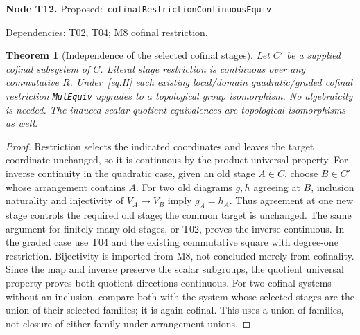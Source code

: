 \documentclass[11pt]{article}
\newtheorem{theorem}{Theorem}[section]
\theoremstyle{remark}\newtheorem{remark}[theorem]{Remark}
\newcommand{\code}[1]{{\normalfont\nolinkurl{#1}}}
\newcommand{\node}[3]{\par\Needspace{8\baselineskip}\smallskip\noindent\textbf{Node #1.}\quad
 \textsf{Proposed:}\ \code{#2}\par\noindent
 \textsf{Dependencies:} #3.\par\smallskip}
\begin{document}
\node{T12}{cofinalRestrictionContinuousEquiv}{T02, T04; M8 cofinal restriction}
\begin{theorem}[Independence of the selected cofinal stages]\label{thm:t12}
Let $C'$ be a supplied cofinal subsystem of $C$. Literal stage
restriction is continuous over any commutative $R$. Under~\eqref{eq:H}
each existing local/domain quadratic/graded cofinal restriction
\code{MulEquiv} upgrades to a topological group isomorphism. No
algebraicity is needed. The induced scalar quotient equivalences
are topological isomorphisms as well.
\end{theorem}
\begin{proof}
Restriction selects the indicated coordinates and leaves the target
coordinate unchanged, so it is continuous by the product universal
property. For inverse continuity in the quadratic case, given an old
stage $A\in C$, choose $B\in C'$ whose arrangement contains $A$.
For two old diagrams $g,h$ agreeing at $B$, inclusion naturality and
injectivity of $V_A\to V_B$ imply $g_A=h_A$. Thus agreement at one
new stage controls the required old stage; the common target is
unchanged. The same argument for finitely many old stages, or T02,
proves the inverse continuous. In the graded case use T04 and the
existing commutative square with degree-one restriction. Bijectivity
is imported from M8, not concluded merely from cofinality. Since the
map and inverse preserve the scalar subgroups, the quotient universal
property proves both quotient directions continuous. For two cofinal
systems without an inclusion, compare both with the system whose
selected stages are the union of their selected families; it is again
cofinal. This uses a union of families, not closure of either family
under arrangement unions.
\end{proof}
\end{document}
